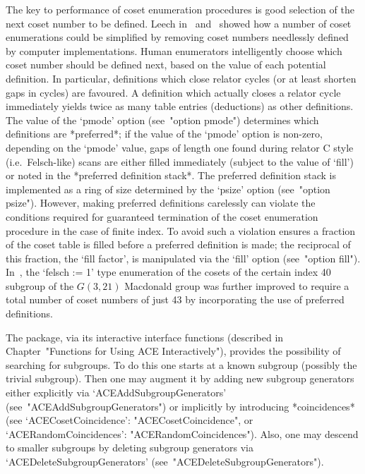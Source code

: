 The key  to  performance  of  coset  enumeration  procedures  is  good
selection  of  the  next   coset   number   to   be   defined.   Leech
in~\cite{Lee77}  and~\cite{Lee84}  showed  how  a  number   of   coset
enumerations could be simplified by removing coset numbers  needlessly
defined by computer implementations. Human  enumerators  intelligently
choose which coset number should be defined next, based on  the  value
of each potential definition. In particular, definitions  which  close
relator cycles (or at least shorten gaps in cycles)  are  favoured.  A
definition which actually closes a relator  cycle  immediately  yields
twice as many table entries (deductions)  as  other  definitions.  The
value of the `pmode'  option  (see~"option  pmode")  determines  which
definitions are *preferred*; if the value of  the  `pmode'  option  is
non-zero, depending on the `pmode' value, gaps  of  length  one  found
during relator C style  (i.e.~Felsch-like)  scans  are  either  filled
immediately  (subject  to  the  value  of  `fill')  or  noted  in  the
*preferred  definition  stack*.  The  preferred  definition  stack  is
implemented as a  ring  of  size  determined  by  the  `psize'  option
(see~"option psize"). However, making preferred definitions carelessly
can violate the conditions required for guaranteed termination of  the
coset enumeration procedure in the case of finite index. To avoid such
a violation {\ACE} ensures a fraction of the  coset  table  is  filled
before  a  preferred  definition  is  made;  the  reciprocal  of  this
fraction, the `fill factor', is  manipulated  via  the  `fill'  option
(see~"option  fill").  In~\cite{Hav91},  the  `felsch   :=   1'   type
enumeration of the cosets of the certain  index  40  subgroup  of  the
$G(3,21)$ Macdonald group was further  improved  to  require  a  total
number of coset numbers  of  just  43  by  incorporating  the  use  of
preferred definitions.


The {\ACE} package, via its  interactive  {\ACE}  interface  functions
(described  in  Chapter~"Functions  for  Using  ACE   Interactively"),
provides the possibility of searching for subgroups. To  do  this  one
starts at a known subgroup (possibly the trivial subgroup).  Then  one
may augment it by adding new subgroup generators either explicitly via
`ACEAddSubgroupGenerators'     (see~"ACEAddSubgroupGenerators")     or
implicitly by introducing *coincidences*  (see  `ACECosetCoincidence':
"ACECosetCoincidence",           or           `ACERandomCoincidences':
"ACERandomCoincidences"). Also, one may descend to  smaller  subgroups
by  deleting  subgroup  generators  via  `ACEDeleteSubgroupGenerators'
(see~"ACEDeleteSubgroupGenerators").

